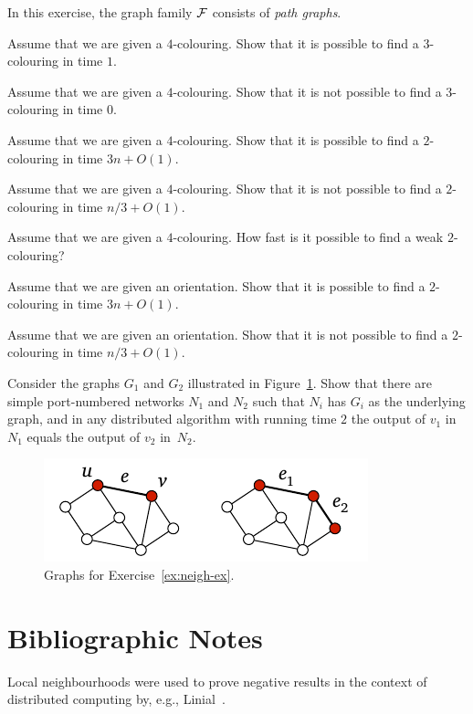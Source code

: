 \begin{ex}
    In this exercise, the graph family $\mathcal{F}$ consists of \emph{path graphs}.
    \begin{subex}
        \item Assume that we are given a $4$-colouring. Show that it is possible to find a $3$-colouring in time $1$.
        \item Assume that we are given a $4$-colouring. Show that it is not possible to find a $3$-colouring in time $0$.
        \item Assume that we are given a $4$-colouring. Show that it is possible to find a $2$-colouring in time $3n+O(1)$.
        \item Assume that we are given a $4$-colouring. Show that it is not possible to find a $2$-colouring in time $n/3+O(1)$.
        \item Assume that we are given a $4$-colouring. How fast is it possible to find a weak $2$-colouring?
        \item Assume that we are given an orientation. Show that it is possible to find a $2$-colouring in time $3n+O(1)$.
        \item Assume that we are given an orientation. Show that it is not possible to find a $2$-colouring in time $n/3+O(1)$.
    \end{subex}
\end{ex}

\begin{ex}\label{ex:neigh-ex}
    Consider the graphs $G_1$ and $G_2$ illustrated in Figure~\ref{fig:neigh-ex}. Show that there are simple port-numbered networks $N_1$ and $N_2$ such that $N_i$ has $G_i$ as the underlying graph, and in any distributed algorithm with running time $2$ the output of $v_1$ in $N_1$ equals the output of $v_2$ in~$N_2$.


    \begin{figure}
        \centering
        \includegraphics[page=\PNeighEx]{figs.pdf}
        \caption{Graphs for Exercise~\ref{ex:neigh-ex}.}\label{fig:neigh-ex}
    \end{figure}
\end{ex}


\section{Bibliographic Notes}

Local neighbourhoods were used to prove negative results in the context of distributed computing by, e.g., Linial~\cite{linial92locality}.
